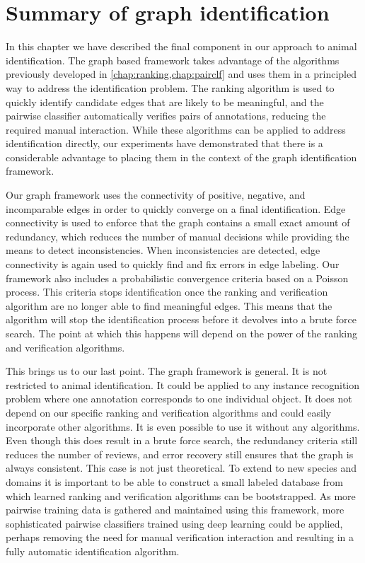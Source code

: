  
\FloatBarrier{}
\section{Summary of graph identification}\label{sec:graphconclusion}

In this chapter we have described the final component in our approach to animal identification.
The graph based framework takes advantage of the algorithms previously developed in
  \cref{chap:ranking,chap:pairclf} and uses them in a principled way to address the identification problem.
The ranking algorithm is used to quickly identify candidate edges that are likely to be meaningful, and the
  pairwise classifier automatically verifies pairs of annotations, reducing the required manual interaction.
While these algorithms can be applied to address identification directly, our experiments have demonstrated that
  there is a considerable advantage to placing them in the context of the graph identification framework.

Our graph framework uses the connectivity of positive, negative, and incomparable edges in order to quickly
  converge on a final identification.
Edge connectivity is used to enforce that the graph contains a small exact amount of redundancy, which reduces
  the number of manual decisions while providing the means to detect inconsistencies.
When inconsistencies are detected, edge connectivity is again used to quickly find and fix errors in edge
  labeling.
Our framework also includes a probabilistic convergence criteria based on a Poisson process.
This criteria stops identification once the ranking and verification algorithm are no longer able to find
  meaningful edges.
This means that the algorithm will stop the identification process before it devolves into a brute force search.
The point at which this happens will depend on the power of the ranking and verification algorithms.

This brings us to our last point.
The graph framework is general.
It is not restricted to animal identification.
It could be applied to any instance recognition problem where one annotation corresponds to one individual
  object.
It does not depend on our specific ranking and verification algorithms and could easily incorporate other
  algorithms.
It is even possible to use it without any algorithms.
Even though this does result in a brute force search, the redundancy criteria still reduces the number of
  reviews, and error recovery still ensures that the graph is always consistent.
This case is not just theoretical.
To extend to new species and domains it is important to be able to construct a small labeled database from which
  learned ranking and verification algorithms can be bootstrapped.
As more pairwise training data is gathered and maintained using this framework, more sophisticated pairwise
  classifiers trained using deep learning could be applied, perhaps removing the need for manual verification
  interaction and resulting in a fully automatic identification algorithm.

